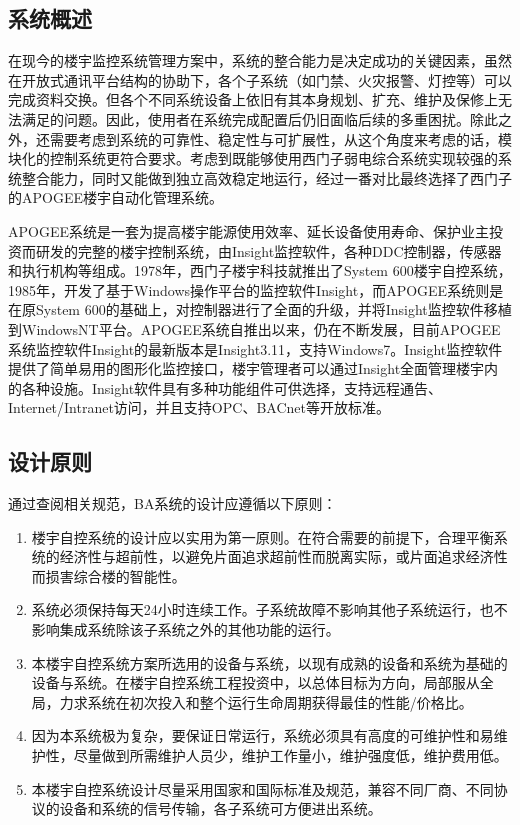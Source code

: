 \documentclass{gdutart}
\begin{document}
    \subsection{系统概述}
    在现今的楼宇监控系统管理方案中，系统的整合能力是决定成功的关键因素，虽然在开放式通讯平台结构的协助下，各个子系统（如门禁、火灾报警、灯控等）可以完成资料交换。但各个不同系统设备上依旧有其本身规划、扩充、维护及保修上无法满足的问题。因此，使用者在系统完成配置后仍旧面临后续的多重困扰。除此之外，还需要考虑到系统的可靠性、稳定性与可扩展性，从这个角度来考虑的话，模块化的控制系统更符合要求。考虑到既能够使用西门子弱电综合系统实现较强的系统整合能力，同时又能做到独立高效稳定地运行，经过一番对比最终选择了西门子的APOGEE楼宇自动化管理系统。

    APOGEE系统是一套为提高楼宇能源使用效率、延长设备使用寿命、保护业主投资而研发的完整的楼宇控制系统，由Insight监控软件，各种DDC控制器，传感器和执行机构等组成。1978年，西门子楼宇科技就推出了System 600楼宇自控系统，1985年，开发了基于Windows操作平台的监控软件Insight，而APOGEE系统则是在原System 600的基础上，对控制器进行了全面的升级，并将Insight监控软件移植到WindowsNT平台。APOGEE系统自推出以来，仍在不断发展，目前APOGEE系统监控软件Insight的最新版本是Insight3.11，支持Windows7。Insight监控软件提供了简单易用的图形化监控接口，楼宇管理者可以通过Insight全面管理楼宇内的各种设施。Insight软件具有多种功能组件可供选择，支持远程通告、Internet/Intranet访问，并且支持OPC、BACnet等开放标准。

    \subsection{设计原则}
    通过查阅相关规范，BA系统的设计应遵循以下原则：
    \begin{enumerate}[label={(\arabic*)}]
      \item 楼宇自控系统的设计应以实用为第一原则。在符合需要的前提下，合理平衡系统的经济性与超前性，以避免片面追求超前性而脱离实际，或片面追求经济性而损害综合楼的智能性。
      \item 系统必须保持每天24小时连续工作。子系统故障不影响其他子系统运行，也不影响集成系统除该子系统之外的其他功能的运行。
      \item 本楼宇自控系统方案所选用的设备与系统，以现有成熟的设备和系统为基础的设备与系统。在楼宇自控系统工程投资中，以总体目标为方向，局部服从全局，力求系统在初次投入和整个运行生命周期获得最佳的性能/价格比。
      \item 因为本系统极为复杂，要保证日常运行，系统必须具有高度的可维护性和易维护性，尽量做到所需维护人员少，维护工作量小，维护强度低，维护费用低。
      \item 本楼宇自控系统设计尽量采用国家和国际标准及规范，兼容不同厂商、不同协议的设备和系统的信号传输，各子系统可方便进出系统。
    \end{enumerate}
\end{document}
